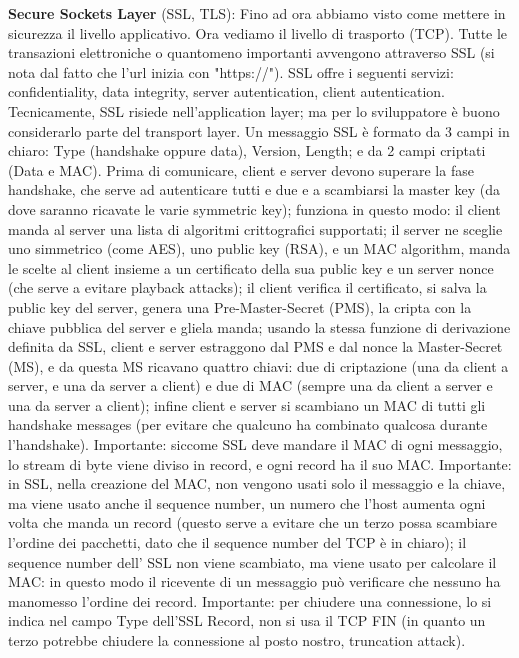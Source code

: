 \documentclass[a4paper,10pt]{article} %
\renewcommand{\b}[1]{%
    {\textbf{#1}}}
\begin{document}
\b{Secure Sockets Layer} (SSL, TLS): Fino ad ora abbiamo visto come mettere in sicurezza il livello applicativo. Ora vediamo il livello di trasporto (TCP). Tutte le transazioni elettroniche o quantomeno importanti avvengono attraverso SSL (si nota dal fatto che l'url inizia con "https://"). SSL offre i seguenti servizi: confidentiality, data integrity, server autentication, client autentication. Tecnicamente, SSL risiede nell'application layer; ma per lo sviluppatore è buono considerarlo parte del transport layer. Un messaggio SSL è formato da 3 campi in chiaro: Type (handshake oppure data), Version, Length; e da 2 campi criptati (Data e MAC). Prima di comunicare, client e server devono superare la fase handshake, che serve ad autenticare tutti e due e a scambiarsi la master key (da dove saranno ricavate le varie symmetric key); funziona in questo modo: il client manda al server una lista di algoritmi crittografici supportati; il server ne sceglie uno simmetrico (come AES), uno public key (RSA), e un MAC algorithm, manda le scelte al client insieme a un certificato della sua public key e un server nonce (che serve a evitare playback attacks); il client verifica il certificato, si salva la public key del server, genera una Pre-Master-Secret (PMS), la cripta con la chiave pubblica del server e gliela manda; usando la stessa funzione di derivazione definita da SSL, client e server estraggono dal PMS e dal nonce la Master-Secret (MS), e da questa MS ricavano quattro chiavi: due di criptazione (una da client a server, e una da server a client) e due di MAC (sempre una da client a server e una da server a client); infine client e server si scambiano un MAC di tutti gli handshake messages (per evitare che qualcuno ha combinato qualcosa durante l'handshake). Importante: siccome SSL deve mandare il MAC di ogni messaggio, lo stream di byte viene diviso in record, e ogni record ha il suo MAC.  Importante: in SSL, nella creazione del MAC, non vengono usati solo il messaggio e la chiave, ma viene usato anche il sequence number, un numero che l'host aumenta ogni volta che manda un record (questo serve a evitare che un terzo possa scambiare l'ordine dei pacchetti, dato che il sequence number del TCP è in chiaro); il sequence number dell' SSL non viene scambiato, ma viene usato per calcolare il MAC: in questo modo il ricevente di un messaggio può verificare che nessuno ha manomesso l'ordine dei record. Importante: per chiudere una connessione, lo si indica nel campo Type dell'SSL Record, non si usa il TCP FIN (in quanto un terzo potrebbe chiudere la connessione al posto nostro, truncation attack).
\end{document}
